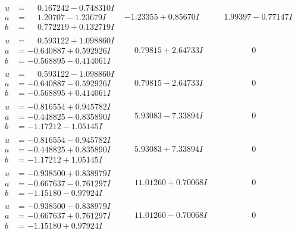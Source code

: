 \documentclass[1p]{elsarticle_modified}
\theoremstyle{definition}
\begin{document}
$$\begin{array}{c|c|c}
\begin{aligned}
u &= \phantom{-}0.167242 - 0.748310 I \\
a &= \phantom{-}1.20707 - 1.23679 I \\
b &= \phantom{-}0.772219 + 0.132719 I\end{aligned}
 & -1.23355 + 0.85670 I & \phantom{-}1.99397 - 0.77147 I \\ \hline\begin{aligned}
u &= \phantom{-}0.593122 + 1.098860 I \\
a &= -0.640887 + 0.592926 I \\
b &= -0.568895 - 0.414061 I\end{aligned}
 & \phantom{-}0.79815 + 2.64733 I & \phantom{-0.000000 } 0 \\ \hline\begin{aligned}
u &= \phantom{-}0.593122 - 1.098860 I \\
a &= -0.640887 - 0.592926 I \\
b &= -0.568895 + 0.414061 I\end{aligned}
 & \phantom{-}0.79815 - 2.64733 I & \phantom{-0.000000 } 0 \\ \hline\begin{aligned}
u &= -0.816554 + 0.945782 I \\
a &= -0.448825 - 0.835890 I \\
b &= -1.17212 - 1.05145 I\end{aligned}
 & \phantom{-}5.93083 - 7.33894 I & \phantom{-0.000000 } 0 \\ \hline\begin{aligned}
u &= -0.816554 - 0.945782 I \\
a &= -0.448825 + 0.835890 I \\
b &= -1.17212 + 1.05145 I\end{aligned}
 & \phantom{-}5.93083 + 7.33894 I & \phantom{-0.000000 } 0 \\ \hline\begin{aligned}
u &= -0.938500 + 0.838979 I \\
a &= -0.667637 - 0.761297 I \\
b &= -1.15180 - 0.97924 I\end{aligned}
 & \phantom{-}11.01260 + 0.70068 I & \phantom{-0.000000 } 0 \\ \hline\begin{aligned}
u &= -0.938500 - 0.838979 I \\
a &= -0.667637 + 0.761297 I \\
b &= -1.15180 + 0.97924 I\end{aligned}
 & \phantom{-}11.01260 - 0.70068 I & \phantom{-0.000000 } 0 \\ \hline\begin{aligned}

\end{aligned}
\end{array}$$
\end{document}
